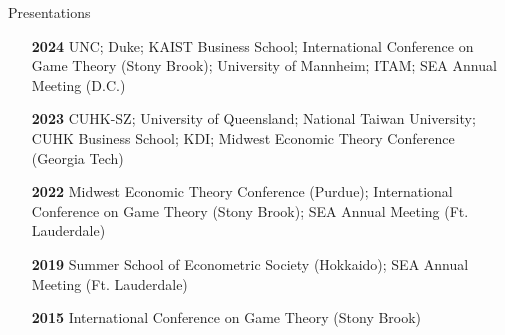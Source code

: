 \begin{rSection}{Presentations}

\begin{itemize}
	\item [\textbf{2024}] UNC; Duke; KAIST Business School; International Conference on Game Theory (Stony Brook); University of Mannheim; ITAM; SEA Annual Meeting (D.C.)
	\item [\textbf{2023}] CUHK-SZ; University of Queensland; National Taiwan University; CUHK Business School; KDI; Midwest Economic Theory Conference (Georgia Tech)
	\item [\textbf{2022}] Midwest Economic Theory Conference (Purdue); International Conference on Game Theory (Stony Brook); SEA Annual Meeting (Ft. Lauderdale)
	\item [\textbf{2019}] Summer School of Econometric Society (Hokkaido); SEA Annual Meeting (Ft. Lauderdale)
	\item [\textbf{2015}] International Conference on Game Theory (Stony Brook)
\end{itemize}
	

\end{rSection}